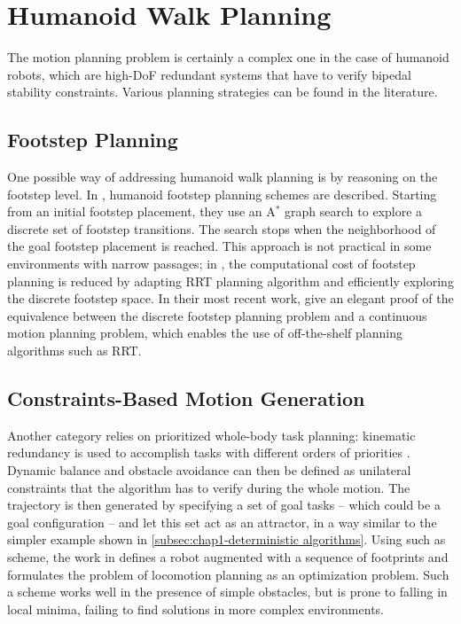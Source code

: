 \section{Humanoid Walk Planning}
\label{sec:chap1-humanoid-walk-planning}

The motion planning problem is certainly a complex one in the case of
humanoid robots, which are high-DoF redundant systems that have to
verify bipedal stability constraints. Various planning strategies can
be found in the literature.

\subsection{Footstep Planning}
\label{subsec:chap1-footstep-planning}

One possible way of addressing humanoid walk planning is by reasoning
on the footstep level. In \cite{kuff01,ches05}, humanoid footstep
planning schemes are described. Starting from an initial footstep
placement, they use an A$^{*}$ graph search \cite{hart68} to explore a
discrete set of footstep transitions. The search stops when the
neighborhood of the goal footstep placement is reached. This approach
is not practical in some environments with narrow passages; in
\cite{xia09, perr11a}, the computational cost of footstep planning is
reduced by adapting RRT planning algorithm and efficiently exploring
the discrete footstep space. In their most recent work, \cite{perr11b,
  perr12} give an elegant proof of the equivalence between the
discrete footstep planning problem and a continuous motion planning
problem, which enables the use of off-the-shelf planning algorithms
such as RRT.

\subsection{Constraints-Based Motion Generation}
\label{subsec:chap1-constraints-motion-generation}

Another category relies on prioritized whole-body task planning:
kinematic redundancy is used to accomplish tasks with different orders
of priorities \cite{khat04, saab-tro-12}. Dynamic balance and obstacle
avoidance can then be defined as unilateral constraints that the
algorithm has to verify during the whole motion. The trajectory is
then generated by specifying a set of goal tasks -- which could be a
goal configuration -- and let this set act as an attractor, in a way
similar to the simpler example shown in
\ref{subsec:chap1-deterministic algorithms}. Using such as scheme, the
work in \cite{kano09} defines a robot augmented with a sequence of
footprints and formulates the problem of locomotion planning as an
optimization problem. Such a scheme works well in the presence of
simple obstacles, but is prone to falling in local minima, failing to
find solutions in more complex environments.

